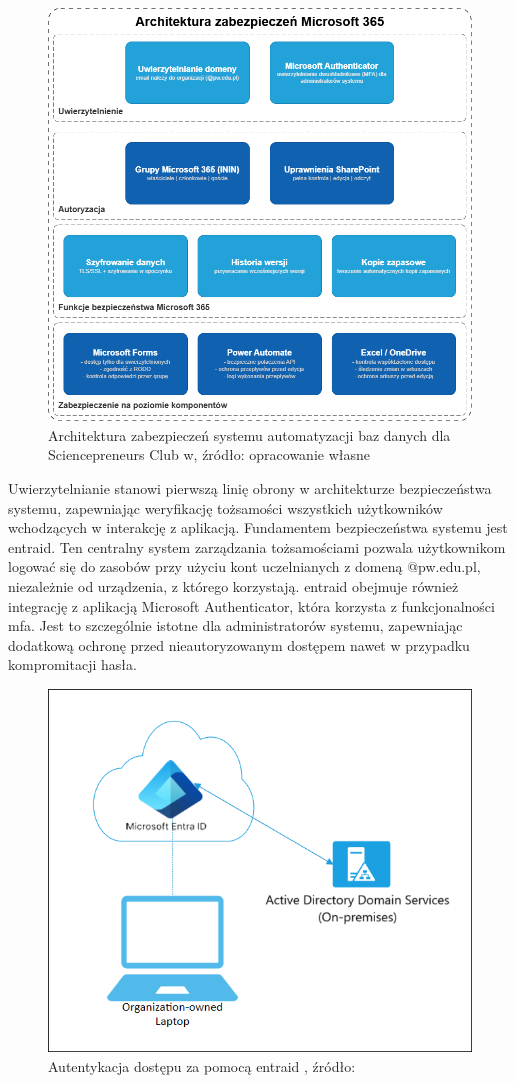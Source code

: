 \begin{figure}[!hb]
	\centering \includegraphics[width=0.85\linewidth]{rysunki/ArchitekturaZabezpieczen.png}
	\caption{Architektura zabezpieczeń systemu automatyzacji baz danych dla Sciencepreneurs Club w, źródło: opracowanie własne}
\end{figure}

Uwierzytelnianie stanowi pierwszą linię obrony w architekturze bezpieczeństwa systemu, zapewniając weryfikację tożsamości wszystkich użytkowników wchodzących w interakcję z aplikacją. Fundamentem bezpieczeństwa systemu jest \gls{entraid}. Ten centralny system zarządzania tożsamościami pozwala użytkownikom logować się do zasobów przy użyciu kont uczelnianych z domeną @pw.edu.pl, niezależnie od urządzenia, z którego korzystają. \gls{entraid} obejmuje również integrację z aplikacją Microsoft Authenticator, która korzysta z funkcjonalności \gls{mfa}. Jest to szczególnie istotne dla administratorów systemu, zapewniając dodatkową ochronę przed nieautoryzowanym dostępem nawet w przypadku kompromitacji hasła.

\begin{figure}[!hb]
	\centering \includegraphics[width=0.7\linewidth]{rysunki/entraid.png}
	\caption{Autentykacja dostępu za pomocą \gls{entraid} , źródło: \cite{microsoft_entra_devices_2025}}
\end{figure}

